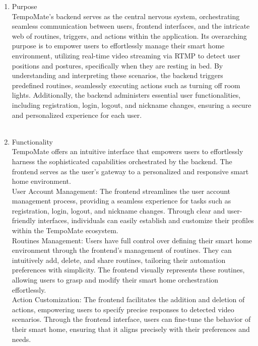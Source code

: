 \begin{enumerate}
      \item Purpose \\
            TempoMate's backend serves as the central nervous system, orchestrating seamless communication between users, frontend interfaces, and the intricate web of routines, triggers, and actions within the application. Its overarching purpose is to empower users to effortlessly manage their smart home environment, utilizing real-time video streaming via RTMP to detect user positions and postures, specifically when they are resting in bed. By understanding and interpreting these scenarios, the backend triggers predefined routines, seamlessly executing actions such as turning off room lights. Additionally, the backend administers essential user functionalities, including registration, login, logout, and nickname changes, ensuring a secure and personalized experience for each user. \\\\
      \item Functionality \\
            TempoMate offers an intuitive interface that empowers users to effortlessly harness the sophisticated capabilities orchestrated by the backend. The frontend serves as the user's gateway to a personalized and responsive smart home environment.\\

            User Account Management:
            The frontend streamlines the user account management process, providing a seamless experience for tasks such as registration, login, logout, and nickname changes. Through clear and user-friendly interfaces, individuals can easily establish and customize their profiles within the TempoMate ecosystem.\\

            Routines Management:
            Users have full control over defining their smart home environment through the frontend's management of routines. They can intuitively add, delete, and share routines, tailoring their automation preferences with simplicity. The frontend visually represents these routines, allowing users to grasp and modify their smart home orchestration effortlessly.\\

            Action Customization:
            The frontend facilitates the addition and deletion of actions, empowering users to specify precise responses to detected video scenarios. Through the frontend interface, users can fine-tune the behavior of their smart home, ensuring that it aligns precisely with their preferences and needs.\\


\end{enumerate}

